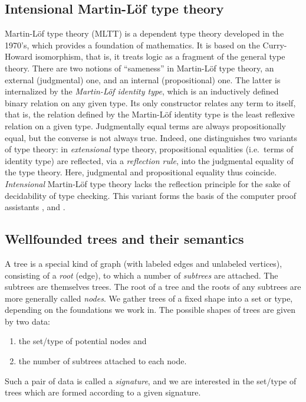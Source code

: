 \documentclass[a4paper,USenglish]{lipics}
\newcommand{\parencite}[1]{\cite{#1}}
\begin{document}
 \subsection{Intensional Martin-Löf type theory}\label{sec:mltt}
 Martin-Löf type theory (MLTT) \parencite{martin_lof} is a dependent type theory developed in the 1970's, which provides a foundation of mathematics.
 It is based on the Curry-Howard isomorphism, that is, it treats logic as a fragment of the general type theory.
 There are two notions of \enquote{sameness} in Martin-Löf type theory, an external (judgmental) one, and an internal (propositional) one.
 The latter is internalized by  the \emph{Martin-Löf identity type}, which is an inductively defined binary relation on any given type.
 Its only constructor relates any term to itself, that is, the relation defined by the Martin-Löf identity type is the least reflexive relation on a given type.
 Judgmentally equal terms are always propositionally equal, but the converse is not always true.
 Indeed, one distinguishes two variants of type theory: in \emph{extensional} type theory, propositional equalities (i.e.\ terms of identity type)
 are reflected, via a \emph{reflection rule}, into the judgmental equality of the type theory.  
 Here, judgmental and propositional equality thus coincide.
 \emph{Intensional} Martin-L\"of type theory  lacks the reflection principle for the sake of decidability of type checking. 
 This variant forms the basis of the computer proof assistants \coq, \matita and \agda.

 

 \subsection{Wellfounded trees and their semantics}\label{sec:sem_ind}
 
 A tree is a special kind of graph (with labeled edges and unlabeled vertices), consisting of a \emph{root} (edge), 
 to which a number of \emph{subtrees} are attached. 
 The subtrees are themselves trees.
 The root of a tree and the roots of any subtrees are more generally called \emph{nodes}.
 We gather trees of a fixed shape into a set or type, depending on the foundations we work in. 
 The possible shapes of trees are given by two data:
 \begin{enumerate}
  \item the set/type of potential nodes and
  \item the number of subtrees attached to each node.
 \end{enumerate}
 Such a pair of data is called a \emph{signature}, and we are interested in the set/type of trees which are formed according to a given signature.
 
\end{document}
